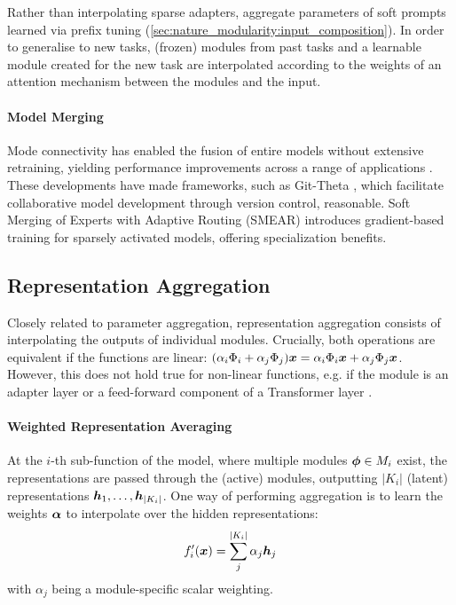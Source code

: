 \documentclass[10pt]{article} %
\begin{document}
Rather than interpolating sparse adapters,
\citet{asai-etal-2022-attempt} aggregate parameters of soft prompts learned via prefix tuning (\cref{sec:nature_modularity:input_composition}). In order to generalise to new tasks, (frozen) modules from past tasks and a learnable module created for the new task are interpolated according to the weights of an attention mechanism between the modules and the input.

\paragraph*{Model Merging}

Mode connectivity has enabled the fusion of entire models without extensive retraining, yielding performance improvements across a range of applications \citep{choshen2022fusing, Gupta2020Stochastic, yadav2023resolving, jin2023dataless}.  These developments have made frameworks, such as Git-Theta \citep{kandpal2023gittheta},  which facilitate collaborative model development through version control, reasonable. 
Soft Merging of Experts with Adaptive Routing (SMEAR) \citep{muqeeth2023soft} introduces gradient-based training for sparsely activated models, offering specialization benefits.

\subsection{Representation Aggregation}
Closely related to parameter aggregation, representation aggregation consists of interpolating the outputs of individual modules. Crucially, both operations are equivalent if the functions are linear: $(\alpha_i\Phi_i + \alpha_j\Phi_j){\bm{x}} = \alpha_i\Phi_i{\bm{x}} + \alpha_j\Phi_j{\bm{x}}$. However, this does not hold true for non-linear functions, e.g. if the module is an adapter layer \citep{houlsby2019parameter} or a feed-forward component of a Transformer layer \citep{fedus2021switch}.

\paragraph*{Weighted Representation Averaging}
At the $i$-th sub-function of the model, where multiple modules ${\bm{\phi}} \in M_i$ exist, the representations are passed through the (active) modules, outputting $|K_i|$ (latent) representations ${\bm{h}}_1, \dots, {\bm{h}}_{|K_i|}$.
One way of performing aggregation is to learn the weights ${\bm{\alpha}}$ to interpolate over the hidden representations:
\begin{equation}
    f_i^\prime({\bm{x}}) =\sum_j^{|K_i|} \alpha_j {\bm{h}}_j 
\end{equation} 
with $\alpha_j$ being a module-specific scalar weighting. 
\end{document}
